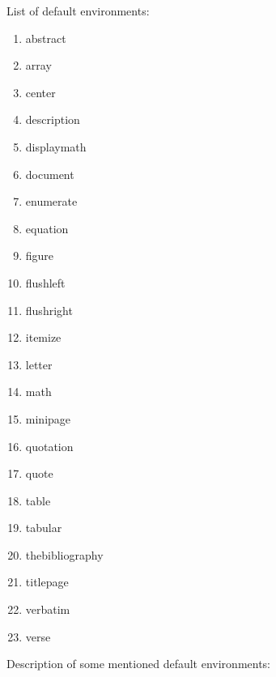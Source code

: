 \documentclass[12pt, a4paper, onecolumn]{article}
\begin{document}
	
	\noindent
	{\LARGE List of default environments:}
	\begin{enumerate}
		
		\item abstract
		\item array
		\item center
		\item description
		\item displaymath
		\item document
		\item enumerate
		\item equation
		\item figure
		\item flushleft
		\item flushright
		\item itemize
		\item letter
		\item math
		\item minipage
		\item quotation
		\item quote
		\item table
		\item tabular
		\item thebibliography
		\item titlepage
		\item verbatim
		\item verse
		
	\end{enumerate}
	
	\noindent
	{\LARGE Description of some mentioned default environments:}
	
\end{document}
